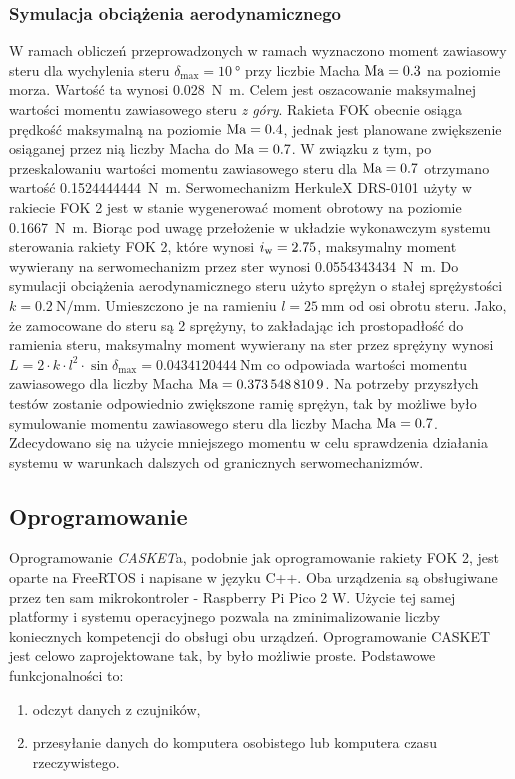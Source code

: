 \subsubsection{Symulacja obciążenia aerodynamicznego}
\label{subsubsec:casket-projekt-obciazenie}
W ramach obliczeń przeprowadzonych w ramach \cite{moraczewski2026canard} wyznaczono moment zawiasowy 
steru dla wychylenia steru \(\delta_{\max} = \SI{10}{\degree}\) przy liczbie Macha \(\textnormal{Ma} = \num{0.3}\) na poziomie morza.
Wartość ta wynosi \SI{0.028}{\newton\meter}. Celem jest oszacowanie maksymalnej wartości momentu zawiasowego steru \textit{z góry}. Rakieta FOK obecnie osiąga prędkość maksymalną na poziomie \(\textnormal{Ma} = 0.4\), jednak 
jest planowane zwiększenie osiąganej przez nią liczby Macha do \(\textnormal{Ma} = 0.7\). W związku z tym, po przeskalowaniu
wartości momentu zawiasowego steru dla \(\textnormal{Ma} = 0.7\) otrzymano wartość \SI{0.1524444444}{\newton\meter}. 
Serwomechanizm HerkuleX DRS-0101 użyty w rakiecie FOK 2 jest w stanie wygenerować moment obrotowy na poziomie \SI{0.1667}{\newton\meter}. Biorąc pod uwagę przełożenie w układzie wykonawczym systemu sterowania rakiety FOK 2, które wynosi \(i_\textnormal{w} = 2.75\), maksymalny moment wywierany na serwomechanizm przez ster wynosi \SI{0.0554343434}{\newton\meter}. 
Do symulacji obciążenia aerodynamicznego steru użyto sprężyn o stałej sprężystości \(k = \SI{0.2}{\newton\per\milli\meter}\). Umieszczono je na ramieniu \(l = \SI{25}{\milli\meter}\) od osi obrotu steru. Jako, że zamocowane do steru są 2 sprężyny, to zakładając ich prostopadłość do ramienia steru, maksymalny moment wywierany na ster przez sprężyny wynosi \(L = 2\cdot k \cdot l ^ 2 \cdot \sin \delta_{\max}= \SI{0.0434120444}{\newton\meter}\) co odpowiada wartości momentu zawiasowego dla liczby Macha \(\textnormal{Ma} = \num{0.3735488109}\). Na potrzeby przyszłych testów zostanie odpowiednio 
zwiększone ramię sprężyn, tak by możliwe było symulowanie momentu zawiasowego steru dla liczby Macha \(\textnormal{Ma} = 0.7\). Zdecydowano się na użycie mniejszego momentu w celu sprawdzenia działania systemu w warunkach dalszych od granicznych serwomechanizmów.

\subsection{Oprogramowanie}
\label{subsec:casket-oprogramowanie}
Oprogramowanie \textit{CASKET}a, podobnie jak oprogramowanie rakiety FOK 2, jest oparte na FreeRTOS i napisane w języku C++.
Oba urządzenia są obsługiwane przez ten sam mikrokontroler - Raspberry Pi Pico 2 W. Użycie tej 
samej platformy i systemu operacyjnego pozwala na zminimalizowanie liczby koniecznych kompetencji do obsługi obu urządzeń.
Oprogramowanie CASKET jest celowo zaprojektowane tak, by było możliwie proste.
Podstawowe funkcjonalności to:
\begin{enumerate}
    \item odczyt danych z czujników,
    \item przesyłanie danych do komputera osobistego lub komputera czasu rzeczywistego.
\end{enumerate}

